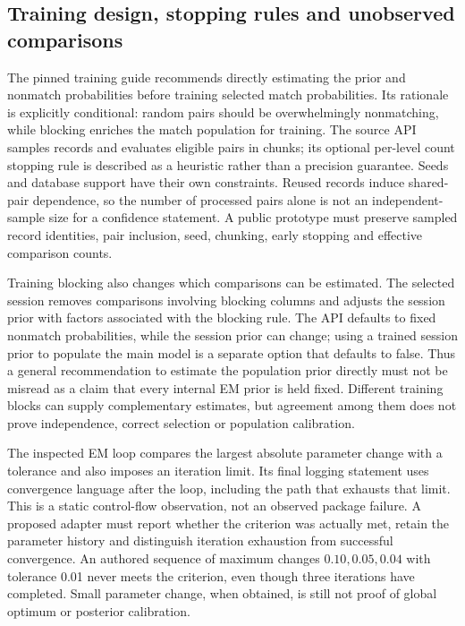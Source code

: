 \subsection{Training design, stopping rules and unobserved comparisons}
The pinned training guide recommends directly estimating the prior and nonmatch probabilities before training selected match probabilities. Its rationale is explicitly conditional: random pairs should be overwhelmingly nonmatching, while blocking enriches the match population for training. The source API samples records and evaluates eligible pairs in chunks; its optional per-level count stopping rule is described as a heuristic rather than a precision guarantee. Seeds and database support have their own constraints. Reused records induce shared-pair dependence, so the number of processed pairs alone is not an independent-sample size for a confidence statement. A public prototype must preserve sampled record identities, pair inclusion, seed, chunking, early stopping and effective comparison counts.~\citep{exec24_splink_sources,exec24_splink_contract}

Training blocking also changes which comparisons can be estimated. The selected session removes comparisons involving blocking columns and adjusts the session prior with factors associated with the blocking rule. The API defaults to fixed nonmatch probabilities, while the session prior can change; using a trained session prior to populate the main model is a separate option that defaults to false. Thus a general recommendation to estimate the population prior directly must not be misread as a claim that every internal EM prior is held fixed. Different training blocks can supply complementary estimates, but agreement among them does not prove independence, correct selection or population calibration.~\citep{exec24_splink_sources}

The inspected EM loop compares the largest absolute parameter change with a tolerance and also imposes an iteration limit. Its final logging statement uses convergence language after the loop, including the path that exhausts that limit. This is a static control-flow observation, not an observed package failure. A proposed adapter must report whether the criterion was actually met, retain the parameter history and distinguish iteration exhaustion from successful convergence. An authored sequence of maximum changes $0.10,0.05,0.04$ with tolerance 0.01 never meets the criterion, even though three iterations have completed. Small parameter change, when obtained, is still not proof of global optimum or posterior calibration.~\citep{exec24_splink_sources,exec24_splink_contract}

